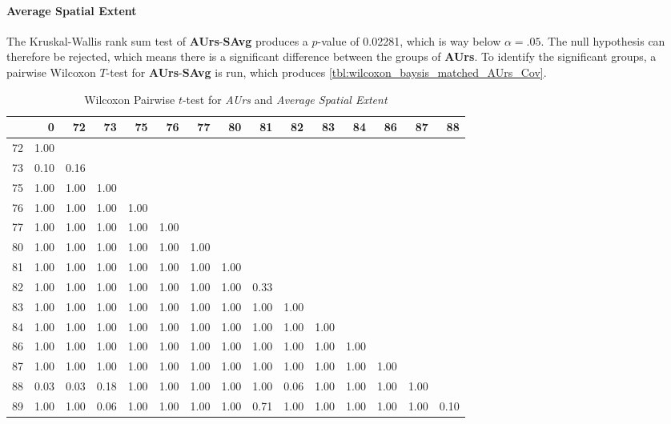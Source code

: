 \paragraph{Average Spatial Extent}
The Kruskal-Wallis rank sum test of \textbf{AUrs}-\textbf{SAvg} produces a $p$-value of 0.02281, which is way below $\alpha=.05$. The null hypothesis can therefore be rejected, which means there is a significant difference between the groups of \textbf{AUrs}. To identify the significant groups, a pairwise Wilcoxon $T$-test for \textbf{AUrs}-\textbf{SAvg} is run, which produces \autoref{tbl:wilcoxon_baysis_matched_AUrs_Cov}.
\begin{table}[ht]
	\tiny
	\centering
	\begin{tabular}{rrrrrrrrrrrrrrr}
		\toprule
		& 0 & 72 & 73 & 75 & 76 & 77 & 80 & 81 & 82 & 83 & 84 & 86 & 87 & 88 \\ 
		\midrule
		72 & 1.00 &  &  &  &  &  &  &  &  &  &  &  &  &  \\ 
		73 & 0.10 & 0.16 &  &  &  &  &  &  &  &  &  &  &  &  \\ 
		75 & 1.00 & 1.00 & 1.00 &  &  &  &  &  &  &  &  &  &  &  \\ 
		76 & 1.00 & 1.00 & 1.00 & 1.00 &  &  &  &  &  &  &  &  &  &  \\ 
		77 & 1.00 & 1.00 & 1.00 & 1.00 & 1.00 &  &  &  &  &  &  &  &  &  \\ 
		80 & 1.00 & 1.00 & 1.00 & 1.00 & 1.00 & 1.00 &  &  &  &  &  &  &  &  \\ 
		81 & 1.00 & 1.00 & 1.00 & 1.00 & 1.00 & 1.00 & 1.00 &  &  &  &  &  &  &  \\ 
		82 & 1.00 & 1.00 & 1.00 & 1.00 & 1.00 & 1.00 & 1.00 & 0.33 &  &  &  &  &  &  \\ 
		83 & 1.00 & 1.00 & 1.00 & 1.00 & 1.00 & 1.00 & 1.00 & 1.00 & 1.00 &  &  &  &  &  \\ 
		84 & 1.00 & 1.00 & 1.00 & 1.00 & 1.00 & 1.00 & 1.00 & 1.00 & 1.00 & 1.00 &  &  &  &  \\ 
		86 & 1.00 & 1.00 & 1.00 & 1.00 & 1.00 & 1.00 & 1.00 & 1.00 & 1.00 & 1.00 & 1.00 &  &  &  \\ 
		87 & 1.00 & 1.00 & 1.00 & 1.00 & 1.00 & 1.00 & 1.00 & 1.00 & 1.00 & 1.00 & 1.00 & 1.00 &  &  \\ 
		88 & 0.03 & 0.03 & 0.18 & 1.00 & 1.00 & 1.00 & 1.00 & 1.00 & 0.06 & 1.00 & 1.00 & 1.00 & 1.00 &  \\ 
		89 & 1.00 & 1.00 & 0.06 & 1.00 & 1.00 & 1.00 & 1.00 & 0.71 & 1.00 & 1.00 & 1.00 & 1.00 & 1.00 & 0.10 \\ 
		\bottomrule
	\end{tabular}
	\caption{Wilcoxon Pairwise $t$-test for \textit{AUrs} and \textit{Average Spatial Extent}}
	\label{tbl:wilcoxon_baysis_matched_AUrs_SAvg}
\end{table}
